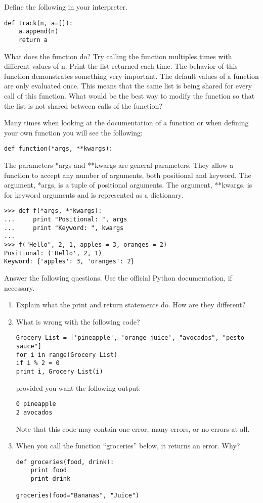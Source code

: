 \begin{example}
\begin{problem}
Define the following in your interpreter.
\begin{lstlisting}
def track(n, a=[]):
    a.append(n)
    return a
\end{lstlisting}
What does the function do?
Try calling the function multiples times with different values of n.
Print the list returned each time.
The behavior of this function demonstrates something very important.
The default values of a function are only evaluated once.
This means that the same list is being shared for every call of this function.
What would be the best way to modify the function so that the list is not shared between calls of the function?
\end{problem}

Many times when looking at the documentation of a function or when defining your own function you will see the following:
\begin{lstlisting}
def function(*args, **kwargs):
\end{lstlisting}

The parameters *args and **kwargs are general parameters.
They allow a function to accept any number of arguments, both positional and keyword.
The argument, *args, is a tuple of positional arguments.
The argument, **kwargs, is for keyword arguments and is represented as a dictionary.
\begin{lstlisting}
>>> def f(*args, **kwargs):
...     print "Positional: ", args
...     print "Keyword: ", kwargs
...     
>>> f("Hello", 2, 1, apples = 3, oranges = 2)
Positional: ('Hello', 2, 1)
Keyword: {'apples': 3, 'oranges': 2}
\end{lstlisting}
\end{example}

\begin{problem}
Answer the following questions. Use the official Python documentation, if necessary.

\begin{enumerate}
\item Explain what the print and return statements do. How are they different?
\item What is wrong with the following code?
\begin{lstlisting}
Grocery List = ['pineapple', 'orange juice', "avocados", "pesto sauce"]
for i in range(Grocery List)
if i % 2 = 0
print i, Grocery List(i)
\end{lstlisting}
provided you want the following output:
\begin{lstlisting}
0 pineapple
2 avocados
\end{lstlisting}
Note that this code may contain one error, many errors, or no errors at all.
\item When you call the function ``groceries'' below, it returns an error. Why?
\begin{lstlisting}
def groceries(food, drink):
    print food
    print drink    

groceries(food="Bananas", "Juice")
\end{lstlisting}
\end{enumerate}
\end{problem}



